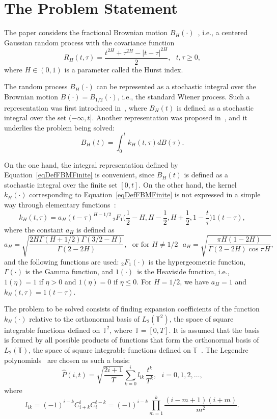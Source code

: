 \documentclass[10pt,reqno]{amsart}
\theoremstyle{plain}
\theoremstyle{remark}
\newcommand{\LPT}{{L_2(\mathds{T})}}
\newcommand{\LPTT}{{L_2(\mathds{T}^2)}}
\begin{document}
\section{The Problem Statement}\label{secFBM}

The paper considers the fractional Brownian motion $B_H(\cdot)$~\cite{Shi_99, BiaHuOksZha_08, Mis_08}, i.e., a centered Gaussian random process with the covariance function
\[
  R_H(t,\tau) = \frac{t^{2H} + \tau^{2H} - |t-\tau|^{2H}}{2}, \ \ \ t,\tau \geqslant 0,
\]
where $H \in (0,1)$ is a parameter called the Hurst index.

The random process $B_H(\cdot)$ can be represented as a stochastic integral over the Brownian motion $B(\cdot) = B_{1/2}(\cdot)$, i.e., the standard Wiener process. Such a representation was first introduced in~\cite{ManNess_SR68}, where $B_H(t)$ is defined as a stochastic integral over the set $(-\infty,t]$. Another representation was proposed in~\cite{DecUst_PA99}, and it underlies the problem being solved:
\begin{equation}\label{eqDefFBMFinite}
  B_H(t) = \int_0^t k_H(t,\tau) dB(\tau).
\end{equation}

On the one hand, the integral representation defined by Equation~\eqref{eqDefFBMFinite} is convenient, since $B_H(t)$ is defined as a stochastic integral over the finite set $[0,t]$. On the other hand, the kernel $k_H(\cdot)$ corresponding to Equation~\eqref{eqDefFBMFinite} is not expressed in a simple way through elementary functions~\cite{BiaHuOksZha_08}:
\[
  k_H(t,\tau) = a_H (t-\tau)^{H-1/2} \, {}_2F_1 \biggl( \frac{1}{2} - H, H - \frac{1}{2}, H + \frac{1}{2}, 1 - \frac{t}{\tau} \biggr) 1(t-\tau),
\]
where the constant $a_H$ is defined as
\[
  a_H = \sqrt{\frac{2H \Gamma(H+1/2) \Gamma(3/2-H)}{\Gamma(2-2H)}}, \ \ \ \text{or for $H \neq 1/2$} \ \ \ a_H = \sqrt{\frac{\pi H (1-2H)}{\Gamma(2-2H) \cos \pi H}},
\]
and the following functions are used: ${}_2F_1(\cdot)$ is the hypergeometric function, $\Gamma(\cdot)$ is the Gamma function, and $1(\cdot)$~is the Heaviside function, i.e., $1(\eta) = 1$ if $\eta > 0$ and $1(\eta) = 0$ if $\eta \leqslant 0$. For $H = 1/2$, we have $a_H = 1$ and $k_H(t,\tau) = 1(t-\tau)$.

The problem to be solved consists of finding expansion coefficients of the function $k_H(\cdot)$ relative to the orthonormal basis of $\LPTT$, the space of square integrable functions defined on $\mathds{T}^2$, where $\mathds{T} = [0,T]$. It is assumed that the basis is formed by all possible products of functions that form the orthonormal basis of $\LPT$, the space of square integrable functions defined on $\mathds{T}$~\cite{Bal_80}. The Legendre polynomials~\cite{SolSemPeshNed_79} are chosen as such a basis:
\begin{equation}\label{eqDefLeg}
  \hat P(i,t) = \sqrt{\frac{2i+1}{T}} \sum\limits_{k=0}^i {l_{ik} \, \frac{t^k}{T^k}}, \ \ \ i = 0,1,2,\dots,
\end{equation}
where
\begin{equation}\label{eqDefLegCoef}
  l_{ik} = (-1)^{i-k} C^i_{i+k} C^{i-k}_i = (-1)^{i-k} \prod\limits_{m=1}^k \frac{(i-m+1)(i+m)}{m^2}.
\end{equation}
\end{document}
